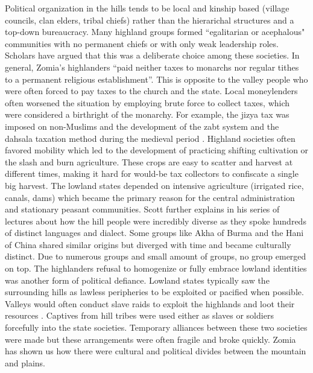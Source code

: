 Political organization in the hills tends to be local and kinship based (village councils, clan elders, tribal chiefs) rather than the hierarichal structures and a top\hyp{}down bureaucracy. Many highland groups formed ``egalitarian or acephalous" communities with no permanent chiefs or with only weak leadership roles. Scholars have argued that this was a deliberate choice among these societies. In general, Zomia’s highlanders ``paid neither taxes to monarchs nor regular tithes to a permanent religious establishment”. This is opposite to the valley people who were often forced to pay taxes to the church and the state. Local moneylenders often worsened the situation by employing brute force to collect taxes, which were considered a birthright of the monarchy. For example, the jizya tax was imposed on non\hyp{}Muslims and the development of the zabt system and the dahsala taxation method during the medieval period \citep{moosvi1973production}. Highland societies often favored mobility which led to the development of practicing shifting cultivation or the slash and burn agriculture. These crops are easy to scatter and harvest at different times, making it hard for would\hyp{}be tax collectors to confiscate a single big harvest. The lowland states depended on intensive agriculture (irrigated rice, canals, dams) which became the primary reason for the central administration and stationary peasant communities. Scott further explains in his series of lectures  \citep{scott2005civilizations} about how the hill people were incredibly diverse as they spoke hundreds of distinct languages and dialect. Some groups like Akha of Burma and the Hani of China shared similar origins \citep{boonyasaranai2014common} but diverged with time and became culturally distinct. Due to numerous groups and small amount of groups, no group emerged on top. The highlanders refusal to homogenize or fully embrace lowland identities was another form of political defiance. Lowland states typically saw the surrounding hills as lawless peripheries to be exploited or pacified when possible. Valleys would often conduct slave raids to exploit the highlands and loot their resources \citep{walker1999legend}. Captives from hill tribes were used either as slaves or soldiers forcefully into the state societies. Temporary alliances between these two societies were made  but these arrangements were often fragile and broke quickly. Zomia has shown us how there were cultural and political divides between the mountain and plains.

